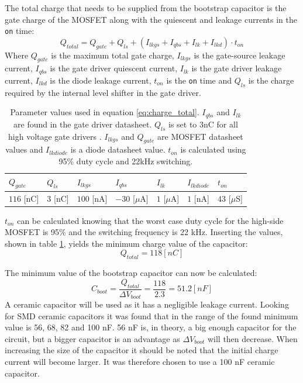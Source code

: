 The total charge that needs to be supplied from the bootstrap capacitor is the gate charge of the MOSFET along with the quiescent and leakage currents in the \texttt{on} time:
\begin{equation}
	Q_{total} = Q_{gate} + Q_{ls} + (I_{lkgs} + I_{qbs} + I_{lk} + I_{lkd}) \cdot t_{on}
	\label{eq:charge_total}
\end{equation}
Where $Q_{gate}$ is the maximum total gate charge, $I_{lkgs}$ is the gate-source leakage current, $I_{qbs}$ is the gate driver quiescent current, $I_{lk}$ is the gate driver leakage current, $I_{lkd}$ is the diode leakage current, $ t_{on}$ is the \texttt{on} time and $Q_{ls}$ is the charge required by the internal level shifter in the gate driver.
\begin{table}[h]
\centering
\begin{tabular}{|l|l|l|l|l|l|l|}
 \hline
 $Q_{gate}$ 	& $Q_{ls}$ 	& $I_{lkgs}$ 	& $I_{qbs}$ 		& $I_{lk}$ 			& $I_{lkdiode}$ 	& $t_{on}$ 		\\ 	\hline
 $116$ [nC]		& $3$ [nC]	& $100$ [nA]	&$-30$ [$\mu$A]		& $1$ [$\mu$A]		& $1$ [nA]			& $43$ [$\mu$S]	\\ 	\hline
\end{tabular}
\caption[Parameter values used to determine total charge.]{Parameter values used in equation \ref{eq:charge_total}. $I_{qbs}$ and $I_{lk}$ are found in the gate driver datasheet. $Q_{ls}$ is set to 3nC for all high voltage gate drivers \cite{bootstrap_ON}. $I_{lkgs}$ and $Q_{gate}$ are MOSFET datasheet values and $I_{lkdiode}$  is a diode datasheet value. $t_{on}$ is calculated using 95\% duty cycle and 22kHz switching.}
\label{tab:bootstrap_parameter}
\end{table}
$t_{on}$ can be calculated knowing that the worst case duty cycle for the high-side MOSFET is 95\% and the switching frequency is 22 kHz.
Inserting the values, shown in table \ref{tab:bootstrap_parameter}, yields the minimum charge value of the capacitor:
\begin{equation}
	Q_{total} = 118 [nC]
\end{equation}

The minimum value of the bootstrap capacitor can now be calculated:
\begin{equation}
	C_{boot} = \frac{Q_{total}}{\Delta V_{boot}} = \frac{118}{2.3} = 51.2 [nF]
\end{equation}
A ceramic capacitor will be used as it has a negligible leakage current. 
Looking for SMD ceramic capacitors it was found that in the range of the found minimum value is 56, 68, 82 and 100 nF.
56 nF is, in theory, a big enough capacitor for the circuit, but a bigger capacitor is an advantage as $\Delta V_{boot}$ will then decrease.
When increasing the size of the capacitor it should be noted that the initial charge current will become larger.
It was therefore chosen to use a 100 nF ceramic capacitor.

